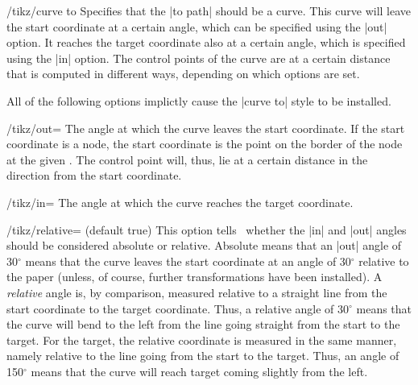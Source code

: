 \begin{key}{/tikz/curve to}
  Specifies that the |to path| should be a curve. This curve will
  leave the start coordinate at a certain angle, which can be
  specified using the |out| option. It reaches the target coordinate
  also at a certain angle, which is specified using the |in|
  option. The control points of the curve are at a certain distance
  that is computed in different ways, depending on which options are
  set.

  All of the following options implictly cause the |curve to| style to
  be installed.

  \begin{key}{/tikz/out=}
    The angle at which the curve leaves the start coordinate. If the
    start coordinate is a node, the start coordinate is the point on the
    border of the node at the given . The control point
    will, thus, lie at a certain distance in the direction 
    from the start coordinate.
\begin{codeexample}[]
\end{codeexample}
  \end{key}
  \begin{key}{/tikz/in=}
    The angle at which the curve reaches the target coordinate.
  \end{key}

  \begin{key}{/tikz/relative= (default true)}
    This option tells \tikzname\ whether the |in| and |out| angles
    should be considered absolute or relative. Absolute means that an
    |out| angle of 30$^\circ$ means that the curve leaves the start
    coordinate at an angle of 30$^\circ$ relative to the paper (unless,
    of course, further transformations have been installed). A
    \emph{relative} angle is, by comparison, measured relative to a
    straight line from the start coordinate to the target
    coordinate. Thus, a relative angle of 30$^\circ$ means that the
    curve will bend to the left from the line going straight from the
    start to the target. For the target, the relative coordinate is
    measured in the same manner, namely relative to the line going from
    the start to the target. Thus, an angle of 150$^\circ$ means that
    the curve will reach target coming slightly from the left.


\end{key}
\end{key}
